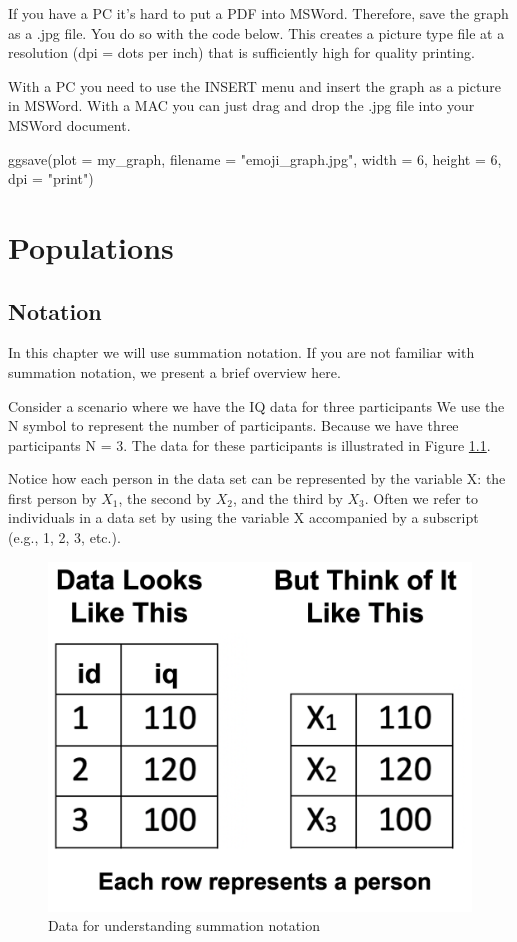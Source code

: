 \documentclass[
]{krantz}
\makeatletter
\newenvironment{Shaded}{\begin{snugshade}}{\end{snugshade}}
\newcommand{\AttributeTok}[1]{\textcolor[rgb]{0.61,0.61,0.61}{#1}}
\newcommand{\DecValTok}[1]{\textcolor[rgb]{0.06,0.06,0.06}{#1}}
\newcommand{\FunctionTok}[1]{\textcolor[rgb]{0,0,0}{#1}}
\newcommand{\NormalTok}[1]{#1}
\newcommand{\StringTok}[1]{\textcolor[rgb]{0.5,0.5,0.5}{#1}}
\newenvironment{kframe}{%
\medskip{}
\setlength{\fboxsep}{.8em}
 \def\at@end@of@kframe{}%
 \ifinner\ifhmode%
  \def\at@end@of@kframe{\end{minipage}}%
  \begin{minipage}{\columnwidth}%
 \fi\fi%
 \def\FrameCommand##1{\hskip\@totalleftmargin \hskip-\fboxsep
 \colorbox{shadecolor}{##1}\hskip-\fboxsep
     \hskip-\linewidth \hskip-\@totalleftmargin \hskip\columnwidth}%
 \MakeFramed {\advance\hsize-\width
   \@totalleftmargin\z@ \linewidth\hsize
   \@setminipage}}%
 {\par\unskip\endMakeFramed%
 \at@end@of@kframe}
\renewenvironment{Shaded}{\begin{kframe}}{\end{kframe}}
\makeatother
\begin{document}
If you have a PC it's hard to put a PDF into MSWord. Therefore, save the graph as a .jpg file. You do so with the code below. This creates a picture type file at a resolution (dpi = dots per inch) that is sufficiently high for quality printing.

With a PC you need to use the INSERT menu and insert the graph as a picture in MSWord. With a MAC you can just drag and drop the .jpg file into your MSWord document.

\begin{Shaded}
\begin{Highlighting}[]
\FunctionTok{ggsave}\NormalTok{(}\AttributeTok{plot =}\NormalTok{ my\_graph, }
       \AttributeTok{filename =} \StringTok{"emoji\_graph.jpg"}\NormalTok{, }
       \AttributeTok{width =} \DecValTok{6}\NormalTok{, }
       \AttributeTok{height =} \DecValTok{6}\NormalTok{, }
       \AttributeTok{dpi =} \StringTok{"print"}\NormalTok{)}
\end{Highlighting}
\end{Shaded}

\hypertarget{populations}{%
\chapter{Populations}\label{populations}}

\hypertarget{notation}{%
\section{Notation}\label{notation}}

In this chapter we will use summation notation. If you are not familiar with summation notation, we present a brief overview here.

Consider a scenario where we have the IQ data for three participants We use the N symbol to represent the number of participants. Because we have three participants N = 3. The data for these participants is illustrated in Figure \ref{fig:notationdata}.

Notice how each person in the data set can be represented by the variable X: the first person by \(X_1\), the second by \(X_2\), and the third by \(X_3\). Often we refer to individuals in a data set by using the variable X accompanied by a subscript (e.g., 1, 2, 3, etc.).

\begin{figure}
\includegraphics[width=0.4\linewidth]{ch_populations/images/screenshot_data_n6} \caption{Data for understanding summation notation}\label{fig:notationdata}
\end{figure}
\end{document}
